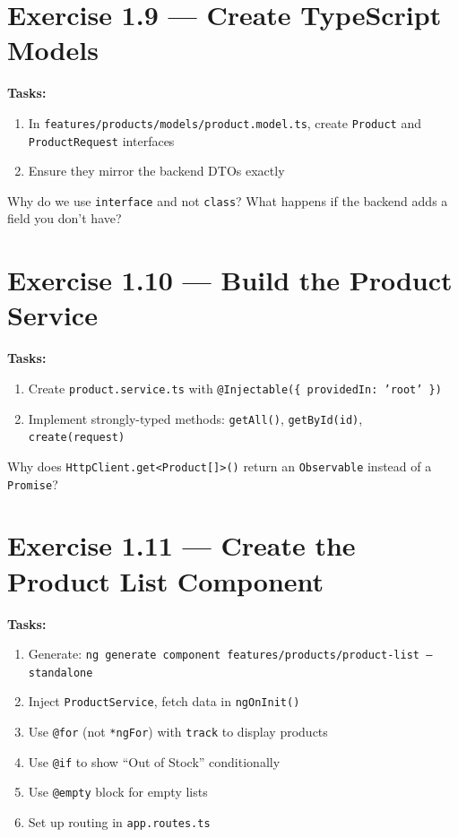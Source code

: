 \documentclass[12pt,a4paper]{report}
\begin{document}
\section{Exercise 1.9 --- Create TypeScript Models}

\textbf{Tasks:}
\begin{enumerate}
    \item In \texttt{features/products/models/product.model.ts}, create \texttt{Product} and \texttt{ProductRequest} interfaces
    \item Ensure they mirror the backend DTOs exactly
\end{enumerate}

\begin{thinkbox}
Why do we use \texttt{interface} and not \texttt{class}? What happens if the backend adds a field you don't have?
\end{thinkbox}

\section{Exercise 1.10 --- Build the Product Service}

\textbf{Tasks:}
\begin{enumerate}
    \item Create \texttt{product.service.ts} with \texttt{@Injectable(\{ providedIn: 'root' \})}
    \item Implement strongly-typed methods: \texttt{getAll()}, \texttt{getById(id)}, \texttt{create(request)}
\end{enumerate}

\begin{thinkbox}
Why does \texttt{HttpClient.get<Product[]>()} return an \texttt{Observable} instead of a \texttt{Promise}?
\end{thinkbox}

\section{Exercise 1.11 --- Create the Product List Component}

\textbf{Tasks:}
\begin{enumerate}
    \item Generate: \texttt{ng generate component features/products/product-list --standalone}
    \item Inject \texttt{ProductService}, fetch data in \texttt{ngOnInit()}
    \item Use \texttt{@for} (not \texttt{*ngFor}) with \texttt{track} to display products
    \item Use \texttt{@if} to show ``Out of Stock'' conditionally
    \item Use \texttt{@empty} block for empty lists
    \item Set up routing in \texttt{app.routes.ts}
\end{enumerate}
\end{document}
